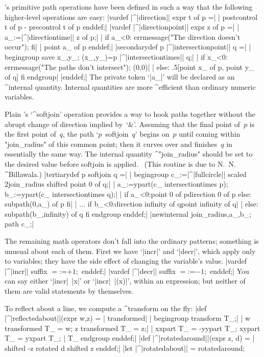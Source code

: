 \MF's primitive path operations have been defined in such a way that the
following higher-level operations are easy:
\beginlines
|vardef |^|direction|| expr t of p =|
| postcontrol t of p - precontrol t of p enddef;|
\smallskip
|vardef |^|directionpoint|| expr z of p =|
| a_:=|^|directiontime|| z of p;|
| if a_<0: errmessage("The direction doesn't occur"); fi|
| point a_ of p enddef;|
\smallskip
|secondarydef p |^|intersectionpoint|| q =|
| begingroup save x_,y_; (x_,y_)=p |^|intersectiontimes|| q;|
| if x_<0: errmessage("The paths don't intersect"); (0,0)|
| else: .5[point x_ of p, point y_ of q] fi endgroup|
|enddef;|
\weakendlines
The private token `|a_|' will be declared as an ^{internal quantity}.
Internal quantities are more ^{efficient} than ordinary numeric variables.

Plain \MF's `^{softjoin}' operation provides a way to hook paths together
without the abrupt change of direction implied by~`\&'. Assuming that
the final point of~$p$ is the first point of~$q$, the path `$p$~softjoin~$q$'
begins on~$p$ until coming within "join\_radius" of this common point;
then it curves over and finishes~$q$ in essentially the same way.
The internal quantity ^"join\_radius" should be set to the desired
value before softjoin is applied. \ (This routine is due to N.~N. ^{Billawala}.)
\beginlines
|tertiarydef p softjoin q =|
| begingroup c_:=|^|fullcircle|| scaled 2join_radius shifted point 0 of q;|
| a_:=ypart(c_ intersectiontimes p); b_:=ypart(c_ intersectiontimes q);|
| if a_<0:point 0 of p{direction 0 of p} else: subpath(0,a_) of p fi|
|  ... if b_<0:{direction infinity of q}point infinity of q|
|   else: subpath(b_,infinity) of q fi endgroup enddef;|
|newinternal join_radius,a_,b_; path c_;|
\endlines

The remaining math operators don't fall into the ordinary patterns; something
is unusual about each of them. First we have `|incr|' and `|decr|', which apply
only to variables; they have the side effect of changing the variable's value.
\beginlines
|vardef |^|incr|| suffix $ = $:=$+1; $ enddef;|
|vardef |^|decr|| suffix $ = $:=$-1; $ enddef;|
\weakendlines
You can say either `|incr|~|x|' or `|incr|~|(x)|', within
an expression; but neither of them are valid statements by themselves.

To reflect about a line, we compute a ^{transform} on the fly:
\beginlines
|def |^|reflectedabout||(expr w,z) =    %
| transformed|
|  begingroup transform T_;|
|  w transformed T_ = w;  z transformed T_ = z;|
|  xxpart T_ = -yypart T_; xypart T_ = yxpart T_; %
|  T_ endgroup enddef;|
\smallskip
|def |^|rotatedaround||(expr z, d) =    %
| shifted -z rotated d shifted z enddef;|
|let |^|rotatedabout|| = rotatedaround;   %
\endlines


